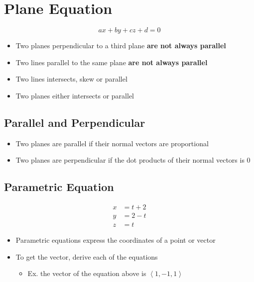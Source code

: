 \section{Plane Equation}

  \begin{equation}
    ax + by + cz + d = 0
  \end{equation}

  \begin{itemize}
    \item Two planes perpendicular to a third plane \textbf{are not always parallel}
    \item Two lines parallel to the same plane \textbf{are not always parallel}
    \item Two lines intersects, skew or parallel
    \item Two planes either intersects or parallel
  \end{itemize}

  \subsection{Parallel and Perpendicular}

    \begin{itemize}
      \item Two planes are parallel if their normal vectors are proportional
      \item Two planes are perpendicular if the dot products of their normal
      vectors is $ 0 $
    \end{itemize}

  \subsection{Parametric Equation}

    \begin{align*}
      x &= t + 2 \\
      y &= 2 - t \\
      z &= t
    \end{align*}

    \begin{itemize}
      \item Parametric equations express the coordinates of a point or vector
      \item To get the vector, derive each of the equations
      \begin{itemize}
        \item Ex. the vector of the equation above is $ \left< 1, -1, 1 \right> $
      \end{itemize}
    \end{itemize}



